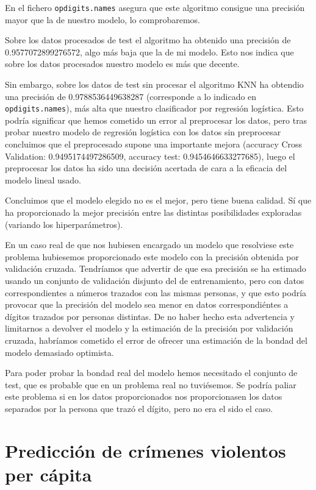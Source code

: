 \documentclass[a4]{article}
\begin{document}
En el fichero \texttt{opdigits.names} asegura que este algoritmo
consigue una precisión mayor que la de nuestro modelo, lo
comprobaremos.

Sobre los datos procesados de test el algoritmo ha obtenido una
precisión de 0.9577072899276572, algo más baja que la de mi modelo.
Esto nos indica que sobre los datos procesados nuestro modelo es más
que decente.

Sin embargo, sobre los datos de test sin procesar el algoritmo KNN ha
obtendio una precisión de 0.9788536449638287 (corresponde a lo
indicado en \texttt{opdigits.names}), más alta que nuestro
clasificador por regresión logística. Esto podría significar que hemos
cometido un error al preprocesar los datos, pero tras probar nuestro
modelo de regresión logística con los datos sin preprocesar concluimos
que el preprocesado supone una importante mejora (accuracy Cross
Validation: 0.9495174497286509, accuracy test: 0.9454646633277685),
luego el preprocesar los datos ha sido una decisión acertada de cara a
la eficacia del modelo lineal usado.

Concluimos que el modelo elegido no es el mejor, pero tiene buena
calidad. Sí que ha proporcionado la mejor precisión entre las
distintas posibilidades exploradas (variando los hiperparámetros).

En un caso real de que nos hubiesen encargado un modelo que resolviese
este problema hubiesemos proporcionado este modelo con la precisión
obtenida por validación cruzada. Tendríamos que advertir de que esa
precisión se ha estimado usando un conjunto de validación disjunto del
de entrenamiento, pero con datos correspondientes a números trazados
con las mismas personas, y que esto podría provocar que la precisión
del modelo sea menor en datos correspondiéntes a dígitos trazados por
personas distintas. De no haber hecho esta advertencia y limitarnos a
devolver el modelo y la estimación de la precisión por validación
cruzada, habríamos cometido el error de ofrecer una estimación de la
bondad del modelo demasiado optimista.

Para poder probar la bondad real del modelo hemos necesitado el
conjunto de test, que es probable que en un problema real no
tuviésemos. Se podría paliar este problema si en los datos
proporcionados nos proporcionasen los datos separados por la
persona que trazó el dígito, pero no era el sido el caso.

\newpage

\section{Predicción de crímenes violentos per cápita}
\end{document}
